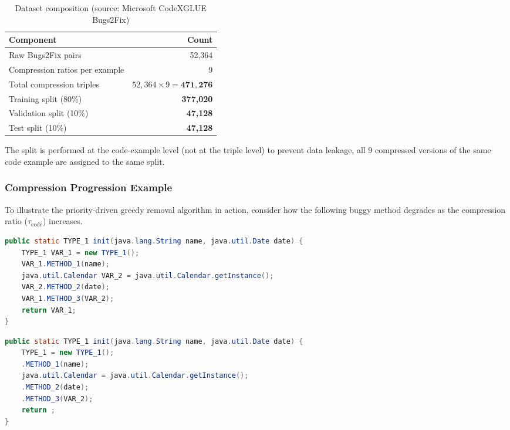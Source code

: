 \documentclass[11pt,a4paper]{article}
\begin{document}
\begin{table}[H]
  \centering
  \caption{Dataset composition (source: Microsoft CodeXGLUE Bugs2Fix)}
  \label{tab:dataset}
  \renewcommand{\arraystretch}{1.15}
  \begin{tabularx}{\textwidth}{X r}
    \toprule
    \textbf{Component} & \textbf{Count} \\
    \midrule
    Raw Bugs2Fix pairs                    & 52,364 \\
    Compression ratios per example        & 9 \\
    Total compression triples             & $52{,}364 \times 9 = \mathbf{471{,}276}$ \\
    Training split (80\%)                 & \textbf{377,020} \\
    Validation split (10\%)               & \textbf{47,128} \\
    Test split (10\%)                     & \textbf{47,128} \\
    \bottomrule
  \end{tabularx}
\end{table}

The split is performed at the code-example level (not at the triple level) to prevent data leakage, all 9 compressed versions of the same code example are assigned to the same split.

\subsubsection*{Compression Progression Example}

To illustrate the priority-driven greedy removal algorithm in action, consider how the following buggy method degrades as the compression ratio ($\tau_{\text{code}}$) increases.

\begin{lstlisting}[language=Java, caption={Original ($\tau_{\text{code}} = 0.0$) --- 0\% tokens removed}]
public static TYPE_1 init(java.lang.String name, java.util.Date date) {
    TYPE_1 VAR_1 = new TYPE_1();
    VAR_1.METHOD_1(name);
    java.util.Calendar VAR_2 = java.util.Calendar.getInstance();
    VAR_2.METHOD_2(date);
    VAR_1.METHOD_3(VAR_2);
    return VAR_1;
}
\end{lstlisting}

\begin{lstlisting}[language=Java, caption={Light Compression ($\tau_{\text{code}} = 0.3$) --- 30\% target. Redundant high-frequency \texttt{Identifier} tokens (\texttt{VAR\_1}, \texttt{VAR\_2}) begin dropping first.}]
public static TYPE_1 init(java.lang.String name, java.util.Date date) {
    TYPE_1 = new TYPE_1();
    .METHOD_1(name);
    java.util.Calendar = java.util.Calendar.getInstance();
    .METHOD_2(date);
    .METHOD_3(VAR_2);
    return ;
}
\end{lstlisting}
\end{document}
